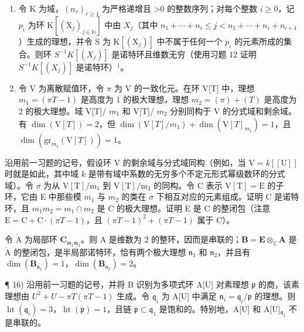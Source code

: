 \begin{enumerate}
\def\labelenumi{\arabic{enumi})}
\setcounter{enumi}{12}
\item
  令 K 为域，\((n_{r})_{r\geqslant1}\) 为严格递增且 \textgreater0 的整数序列；对每个整数 \(i\geqslant0\)，记 \(p_{i}\) 为环 \(\mathrm{K}[(\mathrm{X}_{j})_{j\in\mathbb{N}}]\) 中由 \(X_{j}\)（其中 \(n_{1}+\cdots+n_{i}\leqslant j<n_{1}+\cdots+n_{i}+n_{i+1}\)）生成的理想，并令 S 为 \(\mathrm{K}[(\mathrm{X}_{j})]\) 中不属于任何一个 \(p_{i}\) 的元素所成的集合。则环 \(S^{-1}K[(X_{j})]\) 是诺特环且维数无穷（使用习题 12 证明 \(S^{-1}K[(X_{j})]\) 是诺特环）\(^{1}\)。
\item
  令 V 为离散赋值环，令 \(\pi\) 为 V 的一致化元。在环 V{[}T{]} 中，理想 \(m_1 = (\pi T - 1)\) 是高度为 1 的极大理想，理想 \(m_2 = (\pi) + (T)\) 是高度为 2 的极大理想。域 V{[}T{]}/ \(m_1\) 和 V{[}T{]}/ \(m_2\) 分别同构于 V 的分式域和剩余域。有 \(\dim(\mathrm{V}[T]) = 2\)，但 \(\dim(\mathrm{V}[T]/m_1) + \dim(\mathrm{V}[T]_{m_1}) = 1\)，且 \(\dim(\mathrm{gr}_{m_1}(\mathrm{V}[T])) = 1\)。
\end{enumerate}

  沿用前一习题的记号，假设环 V 的剩余域与分式域同构（例如，当 \(\mathrm{V} = k[[\mathrm{U}]]\) 时就是如此，其中域 \(k\) 是带有域中系数的无穷多个不定元形式幂级数环的分式域）。令 \(\sigma\) 为从 \(\mathrm{V[T] / m_1}\) 到 \(\mathrm{V[T] / m_2}\) 的同构。令 C 表示 \(\mathrm{V[T]} = \mathrm{E}\) 的子环，它由 E 中那些模 \(m_1\) 与 \(m_2\) 的类在 \(\sigma\) 下相互对应的元素组成。证明 C 是诺特环，且 \(m_1m_2 = m_1 \cap m_2\) 是 C 的极大理想。证明 E 是 C 的整闭包（注意 \(\mathrm{E} = \mathrm{C} + \mathrm{C}\cdot(\pi T - 1)\)，且 \((\pi T - 1)^2 + (\pi T - 1)\) 属于 C）。

令 \(\mathring{\mathrm{A}}\) 为局部环 \(\mathbf{C}_{\mathfrak{m}_1\mathfrak{m}_2}\)。则 A 是维数为 2 的整环，因而是串联的；\(\mathbf{B} = \mathbf{E} \otimes_{\mathbb{C}} \mathbf{A}\) 是 \(\mathring{\mathrm{A}}\) 的整闭包，是半局部诺特环，恰有两个极大理想 \(\mathfrak{n}_1\) 和 \(\mathfrak{n}_2\)，并且有 \(\dim(\mathbf{B}_{\mathfrak{n}_1}) = 1\)，\(\dim(\mathbf{B}_{\mathfrak{n}_2}) = 2\)。

¶ 16) 沿用前一习题的记号，并将 B 识别为多项式环 A{[}U{]} 对素理想 \(\mathfrak{p}\) 的商，该素理想由 \(U^2 + U - \pi T(\pi T - 1)\) 生成。令 \(\mathfrak{q}_i\) 为 A{[}U{]} 中满足 \(\mathfrak{n}_i = \mathfrak{q}_i/\mathfrak{p}\) 的理想。则 \(\operatorname{ht}(\mathfrak{q}_i) = 3\)，\(\operatorname{ht}(\mathfrak{p}) = 1\)，且链 \(\mathfrak{p} \subset \mathfrak{q}_1\) 是饱和的。特别地，A{[}U{]} 和 A{[}U{]}\(_{\mathfrak{q}_1}\) 不是串联的。

